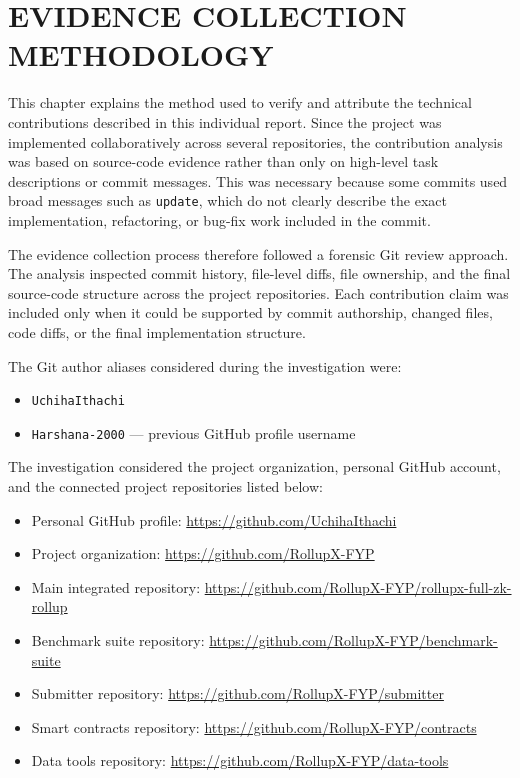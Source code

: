 \chapter{EVIDENCE COLLECTION METHODOLOGY}

This chapter explains the method used to verify and attribute the technical contributions described in this individual report. Since the project was implemented collaboratively across several repositories, the contribution analysis was based on source-code evidence rather than only on high-level task descriptions or commit messages. This was necessary because some commits used broad messages such as \texttt{update}, which do not clearly describe the exact implementation, refactoring, or bug-fix work included in the commit.

The evidence collection process therefore followed a forensic Git review approach. The analysis inspected commit history, file-level diffs, file ownership, and the final source-code structure across the project repositories. Each contribution claim was included only when it could be supported by commit authorship, changed files, code diffs, or the final implementation structure.

The Git author aliases considered during the investigation were:

\begin{itemize}
    \item \texttt{UchihaIthachi}
    \item \texttt{Harshana-2000} — previous GitHub profile username
\end{itemize}

The investigation considered the project organization, personal GitHub account, and the connected project repositories listed below:

\begin{itemize}
    \item Personal GitHub profile: \url{https://github.com/UchihaIthachi}
    \item Project organization: \url{https://github.com/RollupX-FYP}
    \item Main integrated repository: \url{https://github.com/RollupX-FYP/rollupx-full-zk-rollup}
    \item Benchmark suite repository: \url{https://github.com/RollupX-FYP/benchmark-suite}
    \item Submitter repository: \url{https://github.com/RollupX-FYP/submitter}
    \item Smart contracts repository: \url{https://github.com/RollupX-FYP/contracts}
    \item Data tools repository: \url{https://github.com/RollupX-FYP/data-tools}
\end{itemize}

